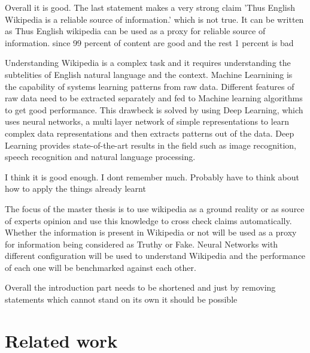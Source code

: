 \documentclass[a4paper, 11pt]{article}
\begin{document}
\color{red}
Overall it is good. The last statement makes a very strong claim 'Thus English Wikipedia is a reliable source of information.' which is not true. It can be written as Thus English wikipedia can be used as a proxy for reliable source of information. since 99 percent of content are good and the rest 1 percent is bad
\color{black}
 
Understanding Wikipedia is a complex task and it requires understanding the subtelities of English natural language and the context. Machine Learnining is the capability of systems learning patterns from raw data. Different features of raw data need to be extracted separately and fed to Machine learning algorithms to get good performance. This drawbeck is solved by using Deep Learning, which uses neural networks, a multi layer network of simple representations to learn complex data representations and then extracts patterns out of the data. Deep Learning provides state-of-the-art results in the field such as image recognition, speech recognition and natural language processing\cite{Goodfellow2016}.

\color{red}
I think it is good enough. I dont remember much. Probably have to think about how to apply the things already learnt
\color{black}

The focus of the master thesis is to use wikipedia as a ground reality or as source of experts opinion and use this knowledge to cross check claims automatically. Whether the information is present in Wikipedia or not will be used as a proxy for information being considered as Truthy or Fake. Neural Networks with different configuration will be used to understand Wikipedia and the performance of each one will be benchmarked against each other.

\color{red}
Overall the introduction part needs to be shortened and just by removing statements which cannot stand on its own it should be possible
\color{black}%
\section{Related work}

\end{document}
